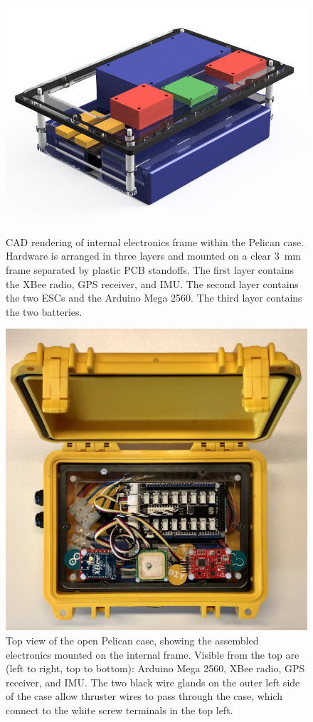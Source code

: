 \documentclass[a4paper]{IEEEtran}
\begin{document}
\begin{figure}
\includegraphics[width=\columnwidth]{assembly.png}
\caption{CAD rendering of internal electronics frame within the Pelican case. Hardware is arranged in three layers and mounted on a clear \SI{3}{mm} frame separated by plastic PCB standoffs. The first layer contains the XBee radio, GPS receiver, and IMU. The second layer contains the two ESCs and the Arduino Mega 2560. The third layer contains the two batteries.}
\label{elecframe}
\end{figure}

\begin{figure}[h!]
\includegraphics[width=\columnwidth]{boat-hardware.jpg}
\caption{Top view of the open Pelican case, showing the assembled electronics mounted on the internal frame. Visible from the top are (left to right, top to bottom): Arduino Mega 2560, XBee radio, GPS receiver, and IMU. The two black wire glands on the outer left side of the case allow thruster wires to pass through the case, which connect to the white screw terminals in the top left.}
\label{boathardware}
\end{figure}
\end{document}
